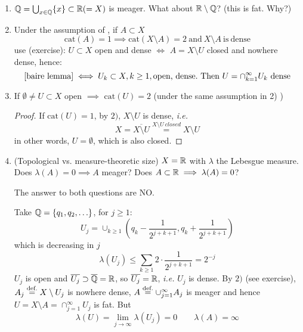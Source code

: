 \documentclass{article}
\begin{document}
\begin{remark}
\begin{enumerate}[1)]
    \item $\mathbb{Q} = \bigcup_{x\in \mathbb{Q}} \{x\} \subset \mathbb{R} (=X)$ is meager. What about $\mathbb{R} \setminus \mathbb{Q}$? (this is fat. Why?)
    \item Under the assumption of , if $A\subset X$  
    $$
    \text{cat}(A)=1 \implies \text{cat}(X \setminus A)=2 \ \text{and} \ X\setminus A \ \text{is} \ \text{dense}
    $$
    use (exercise): $U \subset X$ open and dense $\iff$ $A = X\setminus U$ closed and nowhere dense, hence:  
    \begin{equation*}
        \text{\Cref{baire lemma}} \iff U_k \subset X, k\geq 1, \text{open,\ dense}. \ \text{Then} \ U = \cap_{k=1}^{\infty} U_k \ \text{dense}
    \end{equation*}
    \item If $\emptyset \neq U \subset X$ open $\implies$ $\text{cat}(U)=2$ (under the same assumption in 2) )
    \begin{proof}
        If $\text{cat}(U)=1$, by $2)$, $X\setminus U$ is dense, \textit{i.e.}  
        $$
        X = \overline{X\setminus U}\overset{X\setminus U \ closed}{=} X\setminus U
        $$
        in other words, $U=\emptyset$, which is also closed.
    \end{proof}
    \item (Topological vs. measure-theoretic size)  $X=\mathbb{R}$ with $\lambda$ the Lebesgue measure. Does $\lambda(A)=0 \implies A $ meager? Does $A \subset \mathbb{R} \implies \lambda(A)=0$?  

    The answer to both questions are NO.  
    
    Take $\mathbb{Q} = \{q_1, q_2, \ldots\}$, for $j\geq 1$:  
    $$
    U_j = \cup_{k\geq 1} (q_k - \frac{1}{2^{j+k+1}}, q_k + \frac{1}{2^{j+k+1}})
    $$ 
    which is decreasing in $j$  
    $$
    \lambda(U_j) \leq \sum_{k\geq 1} 2 \cdot \frac{1}{2^{j+k+1}} = 2^{-j}
    $$
    $U_j$ is open and $\overline{U_j} \supset \overline{\mathbb{Q}} = \mathbb{R}$, so $\overline{U_j} = \mathbb{R}$, \textit{i.e.} $U_j$ is dense.  
    By $2)$ (see exercise), $A_j \stackrel{\text{def.}}{=} X \setminus U_j$ is nowhere dense, $A \stackrel{\text{def.}}{=} \cup_{j=1}^{\infty} A_j$ is meager and hence $U = X\setminus A=\cap_{j=1}^{\infty} U_j$ is fat. But  
    $$
    \lambda(U) = \lim_{j\to \infty} \lambda(U_j) = 0 \qquad \lambda(A)=\infty
    $$
\end{enumerate}
\end{remark}
\end{document}
